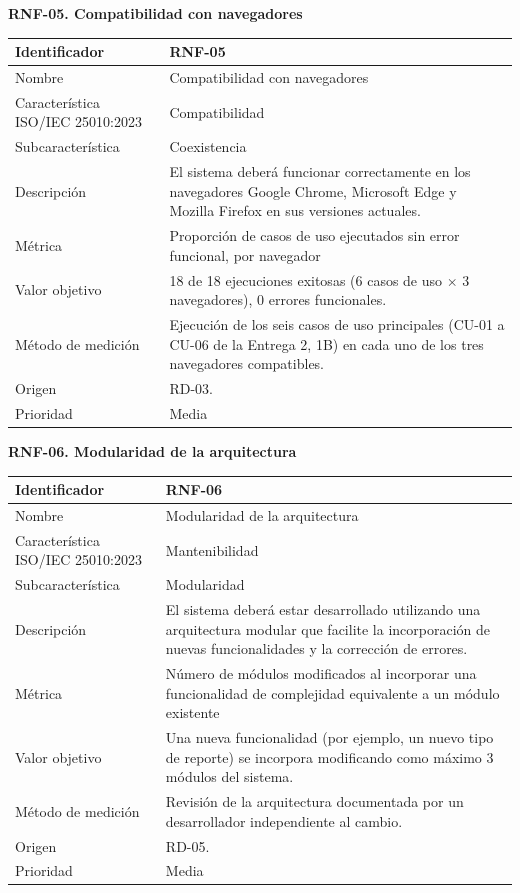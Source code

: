 \documentclass[12pt,a4paper]{article}
\begin{document}
\bigskip
\noindent\textbf{RNF-05. Compatibilidad con navegadores}
\label{tab:RNF-05}

\begin{center}
\begin{longtable}{|p{4.2cm}|p{10cm}|}
\hline
Identificador & RNF-05 \\
\hline
Nombre & Compatibilidad con navegadores \\
\hline
Característica ISO/IEC 25010:2023 & Compatibilidad \\
\hline
Subcaracterística & Coexistencia \\
\hline
Descripción & El sistema deberá funcionar correctamente en los navegadores Google Chrome, Microsoft Edge y Mozilla Firefox en sus versiones actuales. \\
\hline
Métrica & Proporción de casos de uso ejecutados sin error funcional, por navegador \\
\hline
Valor objetivo & 18 de 18 ejecuciones exitosas (6 casos de uso $\times$ 3 navegadores), 0 errores funcionales. \\
\hline
Método de medición & Ejecución de los seis casos de uso principales (CU-01 a CU-06 de la Entrega 2, 1B) en cada uno de los tres navegadores compatibles. \\
\hline
Origen & RD-03. \\
\hline
Prioridad & Media \\
\hline
\end{longtable}
\end{center}

\bigskip
\noindent\textbf{RNF-06. Modularidad de la arquitectura}
\label{tab:RNF-06}

\begin{center}
\begin{longtable}{|p{4.2cm}|p{10cm}|}
\hline
Identificador & RNF-06 \\
\hline
Nombre & Modularidad de la arquitectura \\
\hline
Característica ISO/IEC 25010:2023 & Mantenibilidad \\
\hline
Subcaracterística & Modularidad \\
\hline
Descripción & El sistema deberá estar desarrollado utilizando una arquitectura modular que facilite la incorporación de nuevas funcionalidades y la corrección de errores. \\
\hline
Métrica & Número de módulos modificados al incorporar una funcionalidad de complejidad equivalente a un módulo existente \\
\hline
Valor objetivo & Una nueva funcionalidad (por ejemplo, un nuevo tipo de reporte) se incorpora modificando como máximo 3 módulos del sistema. \\
\hline
Método de medición & Revisión de la arquitectura documentada por un desarrollador independiente al cambio. \\
\hline
Origen & RD-05. \\
\hline
Prioridad & Media \\
\hline
\end{longtable}
\end{center}
\end{document}
